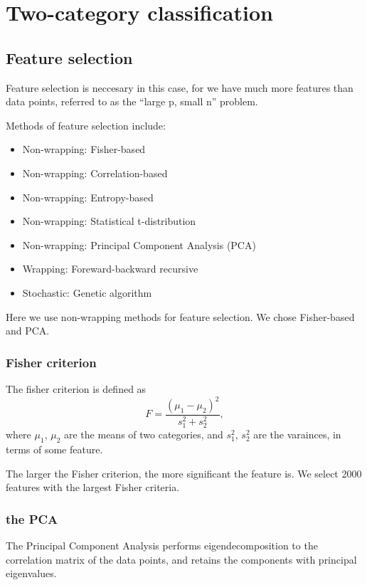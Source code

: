 \documentclass{article}
\begin{document}
\section{Two-category classification}
{
    \subsection{Feature selection}
    {
        Feature selection is neccesary in this case, for we have much more features than data points, referred to as the ``large p, small n'' problem.

        Methods of feature selection include:
        \begin{itemize}
            \item Non-wrapping: Fisher-based
            \item Non-wrapping: Correlation-based
            \item Non-wrapping: Entropy-based
            \item Non-wrapping: Statistical t-distribution
            \item Non-wrapping: Principal Component Analysis (PCA)
            \item Wrapping: Foreward-backward recursive
            \item Stochastic: Genetic algorithm
        \end{itemize}

        Here we use non-wrapping methods for feature selection. We chose Fisher-based and PCA.

        \subsubsection{Fisher criterion}
        {
            The fisher criterion is defined as 
            $$F = \frac{(\mu_1 - \mu_2)^2}{s_1^2 + s_2^2},$$
            where $\mu_1$, $\mu_2$ are the means of two categories, and $s_1^2$, $s_2^2$ are the varainces, in terms of some feature.

            The larger the Fisher criterion, the more significant the feature is. We select 2000 features with the largest Fisher criteria. 
        }

        \subsubsection{the PCA}
        {
            The Principal Component Analysis performs eigendecomposition to the correlation matrix of the data points, and retains the components with principal eigenvalues.

}}}
\end{document}

